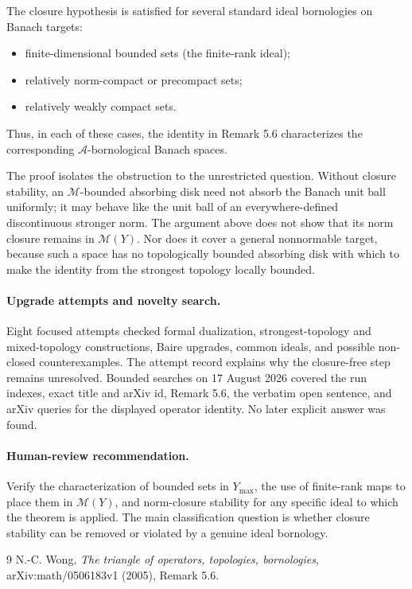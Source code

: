 \documentclass[11pt]{article}
\newcommand{\A}{\mathcal A}
\newcommand{\M}{\mathcal M}
\begin{document}
The closure hypothesis is satisfied for several standard ideal bornologies
on Banach targets:
\begin{itemize}
\item finite-dimensional bounded sets (the finite-rank ideal);
\item relatively norm-compact or precompact sets;
\item relatively weakly compact sets.
\end{itemize}
Thus, in each of these cases, the identity in Remark 5.6 characterizes the
corresponding $\A$-bornological Banach spaces.

The proof isolates the obstruction to the unrestricted question.  Without
closure stability, an $\M$-bounded absorbing disk need not absorb the Banach
unit ball uniformly; it may behave like the unit ball of an
everywhere-defined discontinuous stronger norm.  The argument above does not
show that its norm closure remains in $\M(Y)$.  Nor does it cover a general
nonnormable target, because such a space has no topologically bounded
absorbing disk with which to make the identity from the strongest topology
locally bounded.

\paragraph{Upgrade attempts and novelty search.}
Eight focused attempts checked formal dualization, strongest-topology and
mixed-topology constructions, Baire upgrades, common ideals, and possible
non-closed counterexamples.  The attempt record explains why the closure-free
step remains unresolved.  Bounded searches on 17 August 2026 covered the run
indexes, exact title and arXiv id, Remark 5.6, the verbatim open sentence, and
arXiv queries for the displayed operator identity.  No later explicit answer
was found.

\paragraph{Human-review recommendation.}
Verify the characterization of bounded sets in $Y_{\max}$, the use of
finite-rank maps to place them in $\M(Y)$, and norm-closure stability for any
specific ideal to which the theorem is applied.  The main classification
question is whether closure stability can be removed or violated by a genuine
ideal bornology.

\begin{thebibliography}{9}
N.-C. Wong,
\emph{The triangle of operators, topologies, bornologies},
arXiv:math/0506183v1 (2005), Remark 5.6.
\end{thebibliography}
\end{document}
